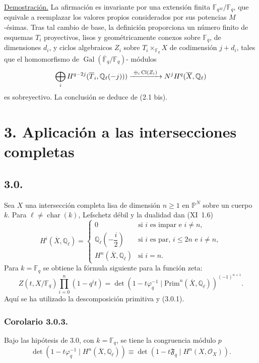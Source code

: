 \noindent\underline{Demostración.}
La afirmación es invariante por una extensión finita
$\mathbb F_{q^M}/\mathbb F_q$, que equivale a reemplazar los valores
propios considerados por sus potencias $M$-ésimas. Tras tal cambio de
base, la definición proporciona un número finito de esquemas $T_i$
proyectivos, lisos y geométricamente conexos sobre $\mathbb F_q$, de
dimensiones $d_i$, y ciclos algebraicos $Z_i$ sobre
$T_i\times_{\mathbb F_q}X$ de codimensión $j+d_i$, tales que el
homomorfismo de $\operatorname{Gal}(\overline{\mathbb F}_q/\mathbb F_q)$-
módulos
\begin{equation*}
\bigoplus_i H^{q-2j}(\overline T_i,\mathbb Q_\ell(-j)))
\xrightarrow{\ \oplus_i\operatorname{Cl}(Z_i)\ }
N^jH^q(\overline X,\mathbb Q_\ell)
\end{equation*}
es sobreyectivo. La conclusión se deduce de (2.1 bis).

\pageoriginale

\section*{3. Aplicación a las intersecciones completas}

\subsection*{3.0.}
Sea $X$ una intersección completa lisa de dimensión $n\geq1$ en
$\mathbb P^N$ sobre un cuerpo $k$. Para
$\ell\ne\operatorname{char}(k)$, Lefschetz débil y la dualidad dan
(XI~1.6)
\begin{equation}\tag{3.0.1}
H^i(\overline X,\mathbb Q_\ell)=
\begin{cases}
0 & \text{si $i$ es impar e $i\ne n$},\\[1.5ex]
\mathbb Q_\ell\!\left(-\dfrac{i}{2}\right)
  & \text{si $i$ es par, $i\leq2n$ e $i\ne n$},\\[1.5ex]
H^n(\overline X,\mathbb Q_\ell) & \text{si $i=n$}.
\end{cases}
\end{equation}
Para $k=\mathbb F_q$ se obtiene la fórmula siguiente para la función zeta:
\begin{equation}\tag{3.0.2}
Z(t,X/\mathbb F_q)\prod_{i=0}^{n}(1-q^it)
=\det\!\left(1-t\varphi_q^{-1}\mid
\mathrm{Prim}^n(\overline X,\mathbb Q_\ell)\right)^{(-1)^{n+1}}.
\end{equation}
Aquí se ha utilizado la descomposición primitiva y (3.0.1).

\subsubsection*{Corolario 3.0.3.}
Bajo las hipótesis de 3.0, con $k=\mathbb F_q$, se tiene la congruencia
módulo $p$
\[
\det\!\left(1-t\varphi_q^{-1}\mid
H^n(\overline X,\mathbb Q_\ell)\right)
\equiv
\det\!\left(1-t\mathfrak F_q\mid H^n(X,\mathcal O_X)\right).
\]


